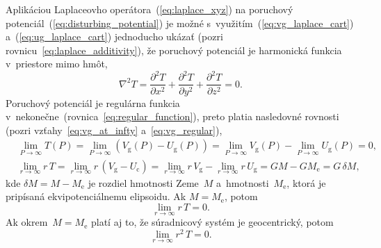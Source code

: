\documentclass[a4paper,12pt]{book}
\newcommand{\gidx}{\mathrm g}
\newcommand{\cidx}{\mathrm c}
\begin{document}
Aplikáciou Laplaceovho operátora~(\ref{eq:laplace_xyz}) na poruchový 
potenciál~(\ref{eq:disturbing_potential}) je možné 
s~využitím~(\ref{eq:vg_laplace_cart}) a~(\ref{eq:ug_laplace_cart}) jednoducho 
ukázať (pozri rovnicu~\ref{eq:laplace_additivity}), že poruchový potenciál je 
harmonická funkcia v~priestore mimo hmôt,
%
\begin{equation}
\nabla^2 T = \frac{\partial^2 T}{\partial x^2} + \frac{\partial^2 T}{\partial 
y^2} + \frac{\partial^2 T}{\partial z^2} = 0{.}
\end{equation}
%
Poruchový potenciál je regulárna funkcia 
v~nekonečne~(rovnica~\ref{eq:regular_function}), preto platia nasledovné 
rovnosti (pozri vzťahy~\ref{eq:vg_at_infty} a~\ref{eq:vg_regular}),
%
\begin{align}
\label{eq:t_infty}
&\lim_{P \rightarrow \infty} T(P) = \lim_{P \rightarrow \infty} (V_\gidx(P) 
- U_\gidx(P)) = \lim_{P \rightarrow \infty} V_\gidx(P) - \lim_{P \rightarrow 
\infty} U_\gidx(P) = 0{,}\\
%
\label{eq:t_regular}
&\lim_{r \rightarrow \infty} r \, T = \lim_{r \rightarrow \infty} r \, (V_\gidx 
 - U_\cidx) = \lim_{r \rightarrow \infty} r \, V_\gidx - \lim_{r \rightarrow 
 \infty} r \, U_\gidx = GM - GM_{\mathrm{e}} = G \, \delta M{,}
\end{align}
%
kde $\delta M = M - M_\mathrm{e}$ je rozdiel hmotnosti Zeme~$M$ 
a~hmotnosti~$M_\mathrm{e}$, ktorá je pripísaná ekvipotenciálnemu elipsoidu.  Ak 
$M = M_\mathrm{e}$, potom
%
\begin{equation}
\lim_{r \rightarrow \infty} r \, T = 0{.}
\end{equation}
%
Ak okrem~$M = M_\mathrm{e}$ platí aj to, že súradnicový systém je geocentrický, 
potom \parencite{Pick1973}
%
\begin{equation}
\lim_{r \rightarrow \infty} r^2 \, T = 0{.}
\end{equation}
\end{document}
